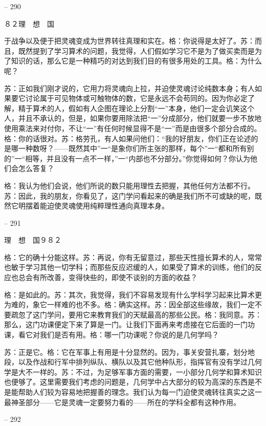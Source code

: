 \documentclass[11pt,oneside]{book}
\begin{document}
\begin{common-format}
    

-- 290

    ８２理　想　国

    于战争以及便于把灵魂变成为世界转往真理和实在。格：你说得是太好了。苏：而且，既然提到了学习算术的问题，我觉得，人们假如学习它不是为了做买卖而是为了知识的话，那么它是一种精巧的对达到我们目的有很多用处的工具。格：为什么呢？

    苏：正如我们刚才说的，它用力将灵魂向上拉，并迫使灵魂讨论纯数本身；有人如果要它讨论属于可见物体或可触物体的数，它是永远不会苟同的。因为你必定了解，精于算术的人，假如有人企图在理论上分割“一”本身，他们一定会讥笑这个人，并且不承认的，但是，如果你要用除法把“一”分成部分，他们就要一步不放地使用乘法来对付你，不让“一”有任何时候显得不是“一”而是由很多个部分合成的。格：你的话很对。苏：格劳孔，有人如果问他们：“我的好朋友，你们正在论述的是哪一种数呀？——既然其中”一“是象你们所主张的那样，每个”一“都和所有别的”一“相等，并且没有一点不一样，”一“内部也不分部分。”你觉得如何？你认为他们会怎么答复？

    格：我认为他们会说，他们所说的数只能用理性去把握，其他任何方法都不行。苏：因此，我的朋友，你看见了，这门学问看起来的确是我们所不可或缺的呢，既然它明摆着能迫使灵魂使用纯粹理性通向真理本身。

    

-- 291

    理　想　国９８２

    格：它的确十分能这样。苏：再说，你有无留意过，那些天性擅长算术的人，常常也敏于学习其他一切学科；而那些反应迟缓的人，如果受了算术的训练，他们的反应也总会有所改善，变得快些的，即使不谈别的方面的收益？

    格：是如此的。苏：其次，我觉得，我们不容易发现有什么学科学习起来比算术更为难的，象它一样难的也不多。格：确实这样。苏：因全部这些缘故，我们一定不要疏忽了这门学问，要用它来教育我们的天赋最高的那些公民。格：我同意。苏：那么，这门功课便定下来了算是一门。让我们下面再来考虑接在它后面的一门功课，看它对我们是否有用。格：哪一门功课呢？你说的是几何学吗？

    苏：正是它。格：它在军事上有用是十分显然的。因为，事关安营扎寨，划分地段，以及作战和行军中排列纵队、横队以及其它他种队形，指挥官有没有学过几何学是大不一样的。苏：不过，为足够军事方面的需要，一小部分几何学和算术知识也便够了。这里需要我们考虑的问题是，几何学中占大部分的较为高深的东西是不是能帮助人们较为容易地把握善的理念。我们认为每一门迫使灵魂转往真实之这一最神圣部分——它是灵魂一定要努力看的——所在的学科全都有这种作用。

    

-- 292


\end{common-format}
\end{document}
